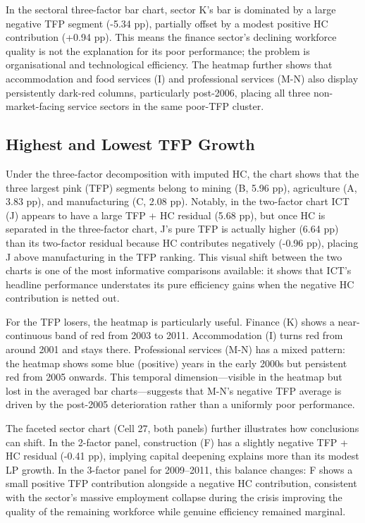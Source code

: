 \documentclass[11pt]{article}
\begin{document}
In the sectoral three-factor bar chart, sector K’s bar is dominated by a large negative TFP segment (-5.34 pp), partially offset by a modest positive HC contribution (+0.94 pp). This means the finance sector’s declining workforce quality is not the explanation for its poor performance; the problem is organisational and technological efficiency. The heatmap further shows that accommodation and food services (I) and professional services (M-N) also display persistently dark-red columns, particularly post-2006, placing all three non-market-facing service sectors in the same poor-TFP cluster.

\subsection{Highest and Lowest TFP Growth}

Under the three-factor decomposition with imputed HC, the chart shows that the three largest pink (TFP) segments belong to mining (B, 5.96 pp), agriculture (A, 3.83 pp), and manufacturing (C, 2.08 pp). Notably, in the two-factor chart ICT (J) appears to have a large TFP + HC residual (5.68 pp), but once HC is separated in the three-factor chart, J's pure TFP is actually higher (6.64 pp) than its two-factor residual because HC contributes negatively (-0.96 pp), placing J above manufacturing in the TFP ranking. This visual shift between the two charts is one of the most informative comparisons available: it shows that ICT's headline performance understates its pure efficiency gains when the negative HC contribution is netted out.

For the TFP losers, the heatmap is particularly useful. Finance (K) shows a near-continuous band of red from 2003 to 2011. Accommodation (I) turns red from around 2001 and stays there. Professional services (M-N) has a mixed pattern: the heatmap shows some blue (positive) years in the early 2000s but persistent red from 2005 onwards. This temporal dimension—visible in the heatmap but lost in the averaged bar charts—suggests that M-N’s negative TFP average is driven by the post-2005 deterioration rather than a uniformly poor performance.

The faceted sector chart (Cell 27, both panels) further illustrates how conclusions can shift. In the 2-factor panel, construction (F) has a slightly negative TFP + HC residual (-0.41 pp), implying capital deepening explains more than its modest LP growth. In the 3-factor panel for 2009–2011, this balance changes: F shows a small positive TFP contribution alongside a negative HC contribution, consistent with the sector’s massive employment collapse during the crisis improving the quality of the remaining workforce while genuine efficiency remained marginal.
\end{document}
